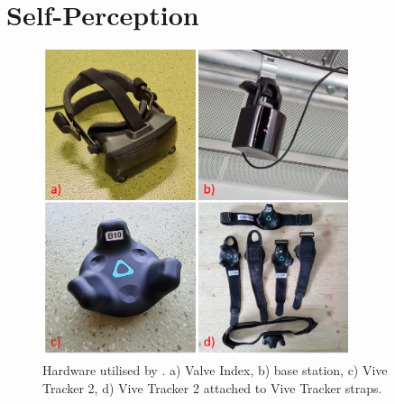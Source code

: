 \section{Self-Perception}
\label{sec:selfperception}
\begin{figure}[H]
	\centering
	\includegraphics[width=0.8\textwidth]{figures/hardware.png}
	\caption[Hardware]{Hardware utilised by \exgo. a) Valve Index, b) base station, c) Vive Tracker 2, d) Vive Tracker 2 attached to Vive Tracker straps.}
	\label{fig:hardware}
\end{figure}

